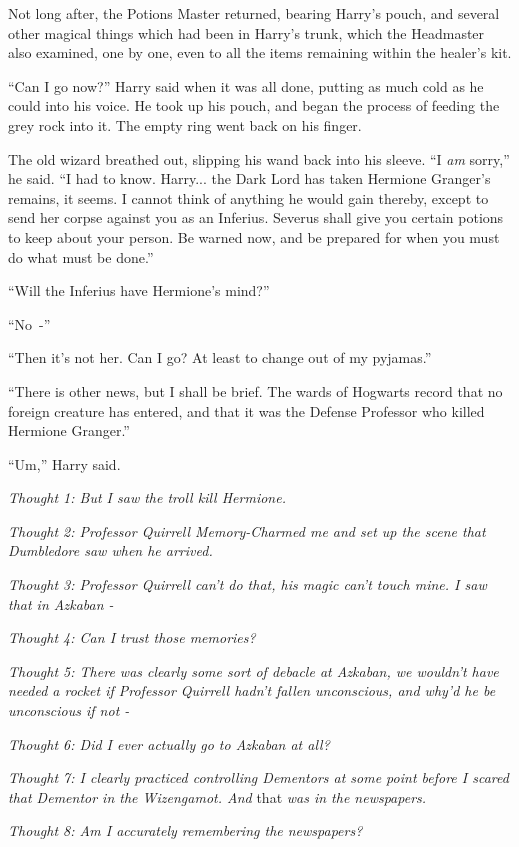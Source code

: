 Not long after, the Potions Master returned, bearing Harry's pouch, and several other magical things which had been in Harry's trunk, which the Headmaster also examined, one by one, even to all the items remaining within the healer's kit.

``Can I go now?'' Harry said when it was all done, putting as much cold as he could into his voice. He took up his pouch, and began the process of feeding the grey rock into it. The empty ring went back on his finger.

The old wizard breathed out, slipping his wand back into his sleeve. ``I \emph{am} sorry,'' he said. ``I had to know. Harry... the Dark Lord has taken Hermione Granger's remains, it seems. I cannot think of anything he would gain thereby, except to send her corpse against you as an Inferius. Severus shall give you certain potions to keep about your person. Be warned now, and be prepared for when you must do what must be done.''

``Will the Inferius have Hermione's mind?''

``No~-''

``Then it's not her. Can I go? At least to change out of my pyjamas.''

``There is other news, but I shall be brief. The wards of Hogwarts record that no foreign creature has entered, and that it was the Defense Professor who killed Hermione Granger.''

``Um,'' Harry said.

\emph{Thought 1: But I saw the troll kill Hermione.}

\emph{Thought 2: Professor Quirrell Memory-Charmed me and set up the scene that Dumbledore saw when he arrived.}

\emph{Thought 3: Professor Quirrell can't do that, his magic can't touch mine. I saw that in Azkaban -}

\emph{Thought 4: Can I trust those memories?}

\emph{Thought 5: There was clearly some sort of debacle at Azkaban, we wouldn't have needed a rocket if Professor Quirrell hadn't fallen unconscious, and why'd he be unconscious if not -}

\emph{Thought 6: Did I ever actually go to Azkaban at all?}

\emph{Thought 7: I clearly practiced controlling Dementors at some point before I scared that Dementor in the Wizengamot. And} that \emph{was in the newspapers.}

\emph{Thought 8: Am I accurately remembering the newspapers?}

